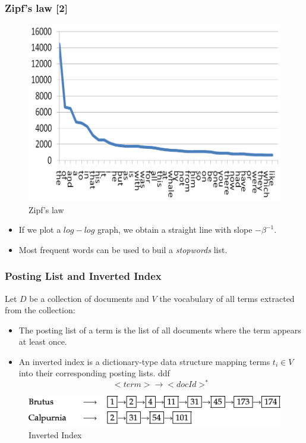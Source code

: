 \documentclass[handout]{beamer}
\begin{document}
\begin{frame}\frametitle{Zipf's law [2]}
\footnotesize{

\begin{figure}[h!]
	\centering
	\includegraphics[scale=0.5]{pics/zipf1.png}
	\caption{Zipf's law}
\end{figure}
\begin{itemize}
 \item If we plot a $log-log$ graph, we obtain a straight line with slope  $-\beta^{-1}$.
 \item Most frequent words can be used to buil a \emph{stopwords} list. 
\end{itemize}
}



 
\end{frame}

\begin{frame}\frametitle{Posting List and Inverted Index}
{\footnotesize Let $D$ be a collection of documents  and $V$ the vocabulary of all terms extracted from the collection:

\begin{itemize}
 \item The posting list of a term is the list of all documents where the term appears at least once.
 \item An inverted index is a dictionary-type data structure mapping terms $t_{i} \in V$ into their corresponding posting lists.  ddf
 \begin{displaymath}
  <term> \rightarrow <docId>^*
 \end{displaymath}

\end{itemize}

\begin{figure}[h!]
	\centering
	\includegraphics[scale=0.6]{pics/invFile.png}
	\caption{Inverted Index}
\end{figure}



}
\end{frame}
\end{document}
